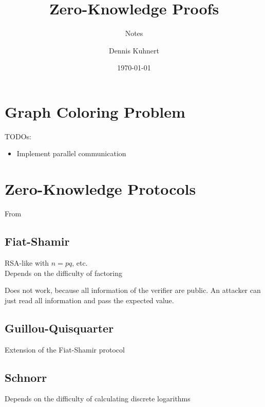 \documentclass[a4paper]{scrartcl}
\title{Zero-Knowledge Proofs}
\subtitle{Notes}
\author{Dennis Kuhnert}
\date{\today}
\begin{document}
\maketitle

\section{Graph Coloring Problem}
TODOs:
\begin{itemize}
	\item Implement parallel communication	
\end{itemize}

\section{Zero-Knowledge Protocols}
From \cite{knapp2009overview}

\subsection{Fiat-Shamir}
RSA-like with $n = pq$, etc.\\
Depends on the difficulty of factoring

Does not work, because all information of the verifier are public.
An attacker can just read all information and pass the expected value.

\subsection{Guillou-Quisquarter}
Extension of the Fiat-Shamir protocol

\subsection{Schnorr}
Depends on the difficulty of calculating discrete logarithms




\end{document}
